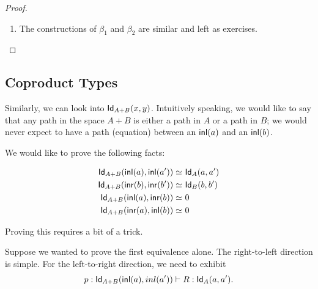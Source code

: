 \documentclass[12pt]{article}
\newcommand{\ap}{\mathsf{ap}}
\begin{document}
\begin{proof}
\begin{enumerate}
  Then,
  $$\eta\defeq J[\ ](p; x.R).$$
  
  By our earlier definition of $\ap$\footnote{
  This is a striking example of anti-modularity. One has no reason to expect that this 
  equality should hold definitionally; it depends essentially on how $\ap$ was defined, 
  not just on its type. It would be nice to avoid this kind of code-on-code dependency,
  since ``the proof should not have to know about the computation."
  }, we have that
  \begin{align*}
   \ap_{\pi_1}(\refl{}(x))\equiv &\ \refl{}(\pi_1(x)) \\
   \ap_{\pi_2}(\refl{}(x))\equiv &\ \refl{}(\pi_2(x))\text{, and from these,} \\
   \ap2_\pair(\refl{}(\pi_1(x))) (\refl{}(\pi_2(x))) \equiv &\ \refl{}\langle \pi_1(x),\pi_2(x)\rangle \\
   \equiv &\ \refl{}(x)
  \end{align*}

  
  \item The constructions of $\beta_1$ and $\beta_2$ are similar and left as exercises.
 \end{enumerate}


\end{proof}

\subsection{Coproduct Types}
Similarly, we can look into $\mathsf{Id}_{A+B}(x,y)$. Intuitively speaking, we would like to say that
any path in the space $A+B$ is either a path in $A$ or a path in $B$; we would never expect to have
a path (equation) between an ${\mathsf{inl}}(a)$ and an ${\mathsf{inl}}(b)$.

We would like to prove the following facts:

\begin{align*}
 \mathsf{Id}_{A+B}({\mathsf{inl}}(a),{\mathsf{inl}}(a'))\simeq &\ \mathsf{Id}_{A}(a,a') \\
 \mathsf{Id}_{A+B}({\mathsf{inr}}(b),{\mathsf{inr}}(b'))\simeq &\ \mathsf{Id}_{B}(b,b') \\
 \mathsf{Id}_{A+B}({\mathsf{inl}}(a),{\mathsf{inr}}(b))\simeq &\ 0 \\
 \mathsf{Id}_{A+B}({\mathsf{inr}}(a),{\mathsf{inl}}(b))\simeq &\ 0
\end{align*}

Proving this requires a bit of a trick.

Suppose we wanted to prove the first equivalence alone.
The right-to-left direction is simple. For the left-to-right direction, we need to exhibit
$$p: \mathsf{Id}_{A+B}({\mathsf{inl}}(a),inl(a'))\vdash R:\mathsf{Id}_{A}(a,a').$$
\end{document}
